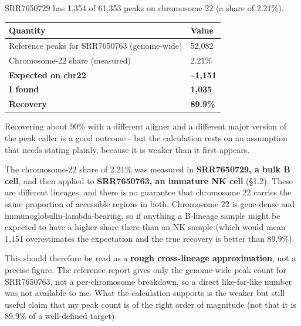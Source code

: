 \documentclass[
  11pt,
  a4paper,
]{article}
\newenvironment{Shaded}{}{}
\newcommand{\AttributeTok}[1]{\textcolor[rgb]{0.49,0.56,0.16}{#1}}
\newcommand{\CommentTok}[1]{\textcolor[rgb]{0.38,0.63,0.69}{\textit{#1}}}
\newcommand{\FunctionTok}[1]{\textcolor[rgb]{0.02,0.16,0.49}{#1}}
\newcommand{\NormalTok}[1]{#1}
\newcommand{\StringTok}[1]{\textcolor[rgb]{0.25,0.44,0.63}{#1}}
\newcommand{\VariableTok}[1]{\textcolor[rgb]{0.10,0.09,0.49}{#1}}
\begin{document}
\begin{Shaded}
\end{Shaded}

SRR7650729 has 1,354 of 61,353 peaks on chromosome 22 (a share of
2.21\%).

\begin{longtable}[]{@{}ll@{}}
\toprule\noalign{}
Quantity & Value \\
\midrule\noalign{}
\endhead
\bottomrule\noalign{}
\endlastfoot
Reference peaks for SRR7650763 (genome-wide) & 52,082 \\
Chromosome-22 share (measured) & 2.21\% \\
\textbf{Expected on chr22} & \textbf{\textasciitilde1,151} \\
\textbf{I found} & \textbf{1,035} \\
\textbf{Recovery} & \textbf{89.9\%} \\
\end{longtable}

Recovering about 90\% with a different aligner and a different major
version of the peak caller is a good outcome - but the calculation rests
on an assumption that needs stating plainly, because it is weaker than
it first appears.

The chromosome-22 share of 2.21\% was measured in \textbf{SRR7650729, a
bulk B cell}, and then applied to \textbf{SRR7650763, an immature NK
cell} (§1.2). These are different lineages, and there is no guarantee
that chromosome 22 carries the same proportion of accessible regions in
both. Chromosome 22 is gene-dense and immunoglobulin-lambda-bearing, so
if anything a B-lineage sample might be expected to have a higher share
there than an NK sample (which would mean 1,151 overestimates the
expectation and the true recovery is better than 89.9\%).

This should therefore be read as a \textbf{rough cross-lineage
approximation}, not a precise figure. The reference report gives only
the genome-wide peak count for SRR7650763, not a per-chromosome
breakdown, so a direct like-for-like number was not available to me.
What the calculation supports is the weaker but still useful claim that
my peak count is of the right order of magnitude (not that it is 89.9\%
of a well-defined target).
\end{document}
